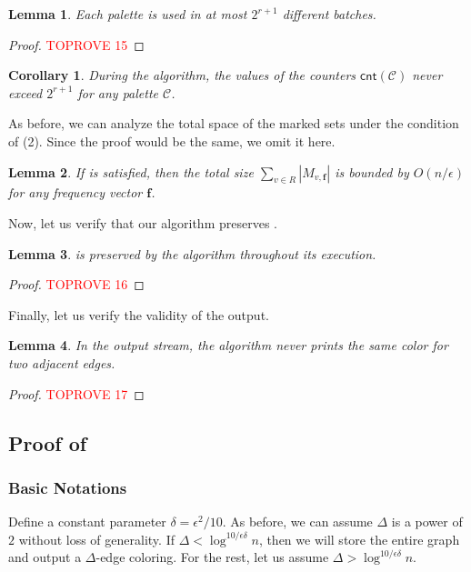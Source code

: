\documentclass[11pt,a4paper]{article}
\newtheorem{lemma}{Lemma}[section]
\newtheorem{corollary}{Corollary}[section]
\newcommand{\freq}{\mathbf{f}}
\newcommand{\clr}{\mathcal{C}}
\newcommand{\cnt}{\mathsf{cnt}}
\begin{document}
\begin{lemma}\label{palette-cnt}
	Each palette is used in at most $2^{r+1}$ different batches.
\end{lemma}
\begin{proof}\textcolor{red}{TOPROVE 15}\end{proof}


\begin{corollary}
	During the algorithm, the values of the counters $\cnt(\clr)$ never exceed $2^{r+1}$ for any palette $\clr$.
\end{corollary}

As before, we can analyze the total space of the marked sets under the condition of (2). Since the proof would be the same, we omit it here.

\begin{lemma}
	If  is satisfied, then the total size $\sum_{v\in R}|M_{v, \freq}|$ is bounded by $O(n/\epsilon)$ for any frequency vector $\freq$.
\end{lemma}

Now, let us verify that our algorithm preserves .
\begin{lemma}
	 is preserved by the algorithm throughout its execution.
\end{lemma}
\begin{proof}\textcolor{red}{TOPROVE 16}\end{proof}

Finally, let us verify the validity of the output.
\begin{lemma}
	In the output stream, the algorithm never prints the same color for two adjacent edges.
\end{lemma}
\begin{proof}\textcolor{red}{TOPROVE 17}\end{proof}

\subsection{Proof of }
\subsubsection{Basic Notations}
Define a constant parameter $\delta = \epsilon^2/10$. As before, we can assume $\Delta$ is a power of $2$ without loss of generality. If $\Delta < \log^{10/\epsilon\delta}n$, then we will store the entire graph and output a $\Delta$-edge coloring. For the rest, let us assume $\Delta > \log^{10/\epsilon\delta}n$.
\end{document}
